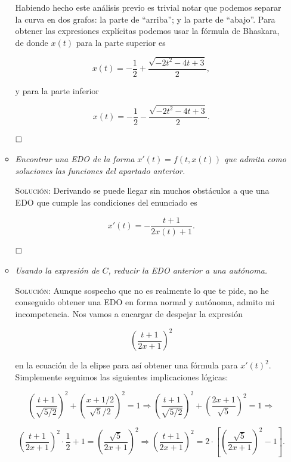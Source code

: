 \documentclass{article}
\begin{document}
\begin{enumerate}
\begin{itemize}
        Habiendo hecho este análisis previo es trivial notar que podemos separar la curva en dos grafos: la parte de ``arriba''; y la parte de ``abajo''. 
        Para obtener las expresiones explícitas podemos usar la fórmula de Bhaskara, de donde $x(t)$ para la parte superior es 

        \[x(t) = -\frac{1}{2} + \frac{\sqrt{-2t^2-4t+3}}{2},\]

        y para la parte inferior

        \[x(t) = -\frac{1}{2} - \frac{\sqrt{-2t^2-4t+3}}{2}.\]

        $\hfill\square$

        \vspace{7px}

        \item \textit{Encontrar una EDO de la forma $x'(t) = f(t, x(t))$ que admita como soluciones las funciones del apartado anterior.}

        \vspace{7px}

        \textsc{Solución:} Derivando se puede llegar sin muchos obstáculos a que una EDO que cumple las condiciones del enunciado es

        \[x'(t) = -\frac{t+1}{2x(t) + 1}.\]

        $\hfill\square$

        \vspace{7px}

        \item \textit{Usando la expresión de $C$, reducir la EDO anterior a una autónoma.}

        \vspace{7px}

        \textsc{Solución:} Aunque sospecho que no es realmente lo que te pide, no he conseguido obtener una EDO en forma normal y autónoma, admito mi incompetencia.
        Nos vamos a encargar de despejar la expresión

        \[\left(\frac{t+1}{2x+1}\right)^2\]

        en la ecuación de la elipse para así obtener una fórmula para $x'(t)^2$. Simplemente seguimos las siguientes implicaciones lógicas:

        \[\left(\frac{t+1}{\sqrt{5/2}}\right)^2 + \left(\frac{x+1/2}{\sqrt{5}/2}\right)^2 = 1 \Rightarrow \left(\frac{t+1}{\sqrt{5/2}}\right)^2 + \left(\frac{2x+1}{\sqrt{5}}\right)^2 = 1 \Rightarrow\]

        \[\left(\frac{t+1}{2x+1}\right)^2 \cdot \frac{1}{2} + 1 = \left(\frac{\sqrt{5}}{2x+1}\right)^2 \Rightarrow \left(\frac{t+1}{2x+1}\right)^2 = 2 \cdot \left[\left(\frac{\sqrt{5}}{2x+1}\right)^2 - 1\right].\]


\end{itemize}
\end{enumerate}
\end{document}
